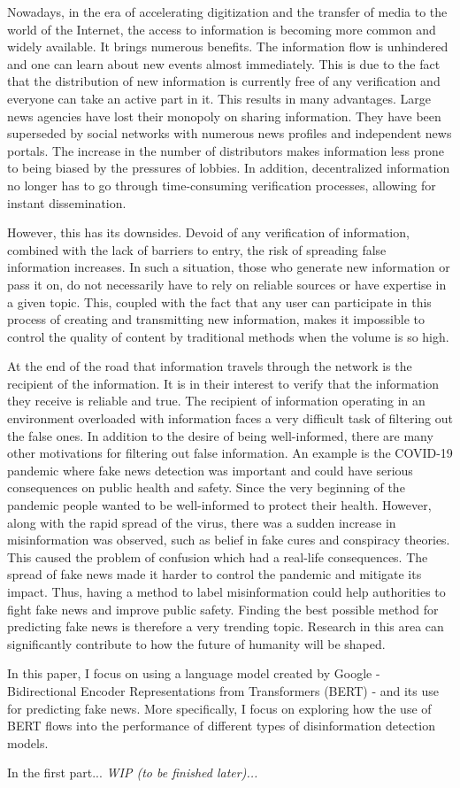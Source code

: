 Nowadays, in the era of accelerating digitization and the transfer of media to the world of the Internet, the access to information is becoming more common and widely available. It brings numerous benefits. The information flow is unhindered and one can learn about new events almost immediately. This is due to the fact that the distribution of new information is currently free of any verification and everyone can take an active part in it. This results in many advantages. Large news agencies have lost their monopoly on sharing information. They have been superseded by social networks with numerous news profiles and independent news portals. The increase in the number of distributors makes information less prone to being biased by the pressures of lobbies. In addition, decentralized information no longer has to go through time-consuming verification processes, allowing for instant dissemination.

However, this has its downsides. Devoid of any verification of information, combined with the lack of barriers to entry, the risk of spreading false information increases. In such a situation, those who generate new information or pass it on, do not necessarily have to rely on reliable sources or have expertise in a given topic. This, coupled with the fact that any user can participate in this process of creating and transmitting new information, makes it impossible to control the quality of content by traditional methods when the volume is so high.

At the end of the road that information travels through the network is the recipient of the information. It is in their interest to verify that the information they receive is reliable and true. The recipient of information operating in an environment overloaded with information faces a very difficult task of filtering out the false ones. In addition to the desire of being well-informed, there are many other motivations for filtering out false information. An example is the COVID-19 pandemic where fake news detection was important and could have serious consequences on public health and safety. Since the very beginning of the pandemic people wanted to be well-informed to protect their health. However, along with the rapid spread of the virus, there was a sudden increase in misinformation was observed, such as belief in fake cures and conspiracy theories. This caused the problem of confusion which had a real-life consequences. The spread of fake news made it harder to control the pandemic and mitigate its impact. Thus, having a method to label misinformation could help authorities to fight fake news and improve public safety. Finding the best possible method for predicting fake news is therefore a very trending topic. Research in this area can significantly contribute to how the future of humanity will be shaped. 

In this paper, I focus on using a language model created by Google - Bidirectional Encoder Representations from Transformers (BERT) - and its use for predicting fake news. More specifically, I focus on exploring how the use of BERT flows into the performance of different types of disinformation detection models.

In the first part... \textit{WIP (to be finished later)...}